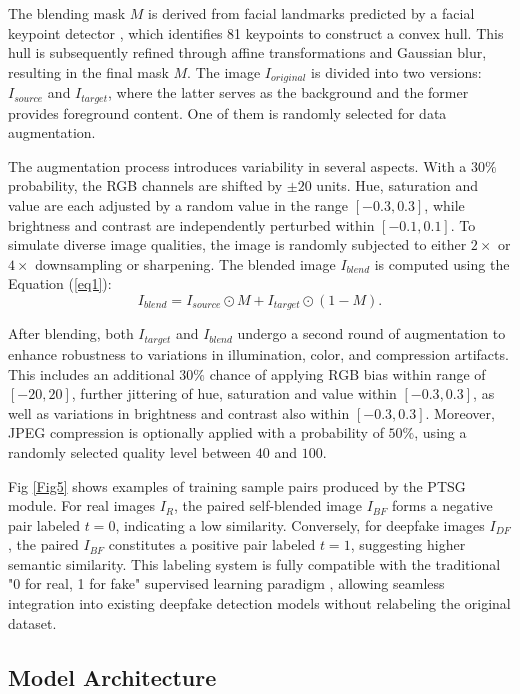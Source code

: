 \documentclass[final,5p,times]{elsarticle}
\begin{document}
The blending mask $M$ is derived from facial landmarks predicted by a facial keypoint detector \cite{32}, which identifies 81 keypoints to construct a convex hull. This hull is subsequently refined through affine transformations and Gaussian blur, resulting in the final mask $M$. The image $I_{original}$ is divided into two versions: $I_{source}$ and $I_{target}$, where the latter serves as the background and the former provides foreground content. One of them is randomly selected for data augmentation.

The augmentation process introduces variability in several aspects. With a $30\%$ probability, the RGB channels are shifted by $\pm20$ units. Hue, saturation and value are each adjusted by a random value in the range $[-0.3,0.3]$, while brightness and contrast are independently perturbed within $[-0.1,0.1]$. To simulate diverse image qualities, the image is randomly subjected to either $2\times$ or $4\times$ downsampling or sharpening. The blended image $I_{blend}$ is computed using the Equation (\ref{eq1}):
\begin{equation} \label{eq1}
I_{blend}=I_{source} \odot M+I_{target} \odot (1-M).
\end{equation}

After blending, both $I_{target}$ and $I_{blend}$ undergo a second round of augmentation to enhance robustness to variations in illumination, color, and compression artifacts. This includes an additional $30\%$ chance of applying RGB bias within range of $[-20,20]$, further jittering of hue, saturation and value within $[-0.3,0.3]$, as well as variations in brightness and contrast also within $[-0.3,0.3]$. Moreover, JPEG compression is optionally applied with a probability of $50\%$, using a randomly selected quality level between $40$ and $100$.

Fig \ref{Fig5} shows examples of training sample pairs produced by the PTSG module. For real images $I_R$, the paired self-blended image $I_{BF}$ forms a negative pair labeled $t=0$, indicating a low similarity. Conversely, for deepfake images $I_{DF}$, the paired $I_{BF}$ constitutes a positive pair labeled $t=1$, suggesting higher semantic similarity. This labeling system is fully compatible with the traditional "0 for real, 1 for fake" supervised learning paradigm \cite{33}, allowing seamless integration into existing deepfake detection models without relabeling the original dataset.

\subsection{Model Architecture} \label{ma}
\end{document}
